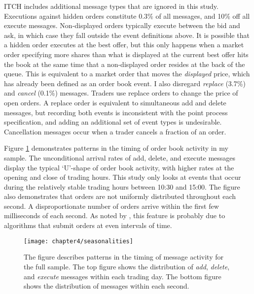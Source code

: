 	ITCH includes additional message types that are ignored in this study. Executions against hidden orders constitute 0.3\% of all messages, and 10\% off all execute messages. Non-displayed orders typically execute between the bid and ask, in which case they fall outside the event definitions above. It is possible that a hidden order executes at the best offer, but this only happens when a market order specifying more shares than what is displayed at the current best offer hits the book at the same time that a non-displayed order resides at the back of the queue. This is equivalent to a market order that moves the \textit{displayed} price, which has already been defined as an order book event. I also disregard \textit{replace} (3.7\%) and \textit{cancel} (0.1\%) messages.
	Traders use replace orders to change the price of open orders. A replace order is equivalent to simultaneous add and delete messages, but recording both events is inconsistent with the point process specification, and adding an additional set of event types is undesirable. Cancellation messages occur when a trader cancels a fraction of an order.

	Figure \ref{fig:seasonalities} demonstrates patterns in the timing of order book activity in my sample. The unconditional arrival rates of add, delete, and execute messages display the typical `U'-shape of order book activity, with higher rates at the opening and close of trading hours. This study only looks at events that occur during the relatively stable trading hours between 10:30 and 15:00. The figure also demonstrates that orders are not uniformly distributed throughout each second. A disproportionate number of orders arrive within the first few milliseconds of each second. As noted by \cite{Hasbrouck2013}, this feature is probably due to algorithms that submit orders at even intervals of time.

	\begin{figure}[t]
		\small
		\linespread{1}
		\centering
		\texttt{[image: chapter4/seasonalities]}
		\captionsetup{skip=-20pt, labelsep=colon, font=footnotesize, width=\linewidth, justification=justified}
		\caption[Message activity seasonalities]{The figure describes patterns in the timing of message activity for the full sample. The top figure shows the distribution of \textit{add}, \textit{delete}, and \textit{execute} messages within each trading day. The bottom figure shows the distribution of messages within each second.}
		\label{fig:seasonalities}
	\end{figure}


